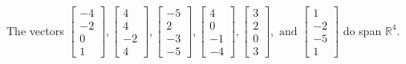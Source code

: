 \begin{exercise}
\begin{exerciseStatement}
  \end{exerciseStatement}
  \begin{exerciseAnswer}
   The vectors \(\left[\begin{array}{r}
-4 \\
-2 \\
0 \\
1
\end{array}\right] , \left[\begin{array}{r}
4 \\
4 \\
-2 \\
4
\end{array}\right] , \left[\begin{array}{r}
-5 \\
2 \\
-3 \\
-5
\end{array}\right] , \left[\begin{array}{r}
4 \\
0 \\
-1 \\
-4
\end{array}\right] , \left[\begin{array}{r}
3 \\
2 \\
0 \\
3
\end{array}\right] , \text{ and } \left[\begin{array}{r}
1 \\
-2 \\
-5 \\
1
\end{array}\right]\) 
  	 do  
	span \(\mathbb{R}^4\).
  


  \end{exerciseAnswer}
\end{exercise}